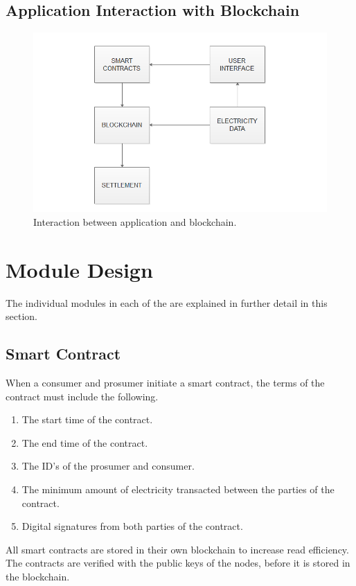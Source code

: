 \subsection{Application Interaction with Blockchain}
\begin{figure}[!htb]
\centering
	\includegraphics[width=1\textwidth]{Images/application-blockchain}
	\caption{Interaction between application and blockchain.}
	\label{fig:app_blockchain}
\end{figure}

\section{Module Design}
The individual modules in each of the are explained in further detail in this section.
\subsection{Smart Contract}\label{smart}
When a consumer and prosumer initiate a smart contract, the terms of the contract must include the following.
\begin{enumerate}
\item The start time of the contract.
\item The end time of the contract.
\item The ID's of the prosumer and consumer.
\item The minimum amount of electricity transacted between the parties of the contract.
\item Digital signatures from both parties of the contract.
\end{enumerate}

All smart contracts are stored in their own blockchain to increase read efficiency. The contracts are verified with the public keys of the nodes, before it is stored in the blockchain.


